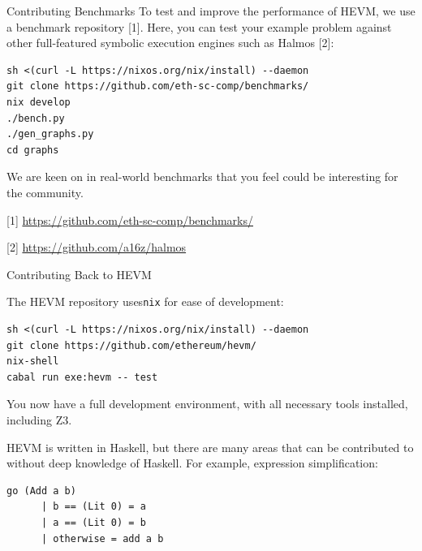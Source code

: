 \documentclass{beamer}
\begin{document}
\begin{frame}[fragile=singleslide]{Contributing Benchmarks}
To test and improve the performance of HEVM, we use a benchmark repository [1]. Here, you can test your example problem against other full-featured symbolic execution engines such as Halmos [2]:


\begin{Verbatim}[frame=single, framerule=0.2mm, framesep=2mm,fontsize=\footnotesize]
sh <(curl -L https://nixos.org/nix/install) --daemon
git clone https://github.com/eth-sc-comp/benchmarks/
nix develop
./bench.py
./gen_graphs.py
cd graphs
\end{Verbatim}

We are keen on in real-world benchmarks that you feel could be interesting for the community.

\bigskip

[1] \url{https://github.com/eth-sc-comp/benchmarks/}

[2] \url{https://github.com/a16z/halmos}
\end{frame}


\begin{frame}[fragile=singleslide]{Contributing Back to HEVM}

The HEVM repository uses\texttt{nix} for ease of development:

\begin{Verbatim}[frame=single, framerule=0.2mm, framesep=2mm,fontsize=\footnotesize]
sh <(curl -L https://nixos.org/nix/install) --daemon
git clone https://github.com/ethereum/hevm/
nix-shell
cabal run exe:hevm -- test
\end{Verbatim}

You now have a full development environment, with all necessary tools installed, including Z3.
\bigskip 

HEVM is written in Haskell, but there are many areas that can be contributed to without deep knowledge of Haskell. For example, expression simplification:

\begin{Verbatim}[frame=single, framerule=0.2mm, framesep=2mm,fontsize=\footnotesize]
    go (Add a b)
      | b == (Lit 0) = a
      | a == (Lit 0) = b
      | otherwise = add a b
\end{Verbatim}
\end{frame}
\end{document}
